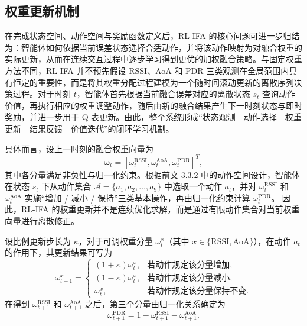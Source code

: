 \subsection{权重更新机制}
\label{subsec:3_3_4}

在完成状态空间、动作空间与奖励函数定义后，RL-IFA 的核心问题可进一步归结为：智能体如何依据当前误差状态选择合适动作，并将该动作映射为对融合权重的实际更新，从而在连续交互过程中逐步学习得到更优的加权融合策略。与固定权重方法不同，RL-IFA 并不预先假设 RSSI、AoA 和 PDR 三类观测在全局范围内具有恒定的重要性，而是将其权重分配过程建模为一个随时间滚动更新的离散序列决策过程。对于时刻 \(t\)，智能体首先根据当前融合误差对应的离散状态 \(s_t\) 查询动作价值，再执行相应的权重调整动作，随后由新的融合结果产生下一时刻状态与即时奖励，并进一步用于 Q 表更新。由此，整个系统形成“状态观测—动作选择—权重更新—结果反馈—价值迭代”的闭环学习机制。

具体而言，设上一时刻的融合权重向量为
\begin{equation}
\boldsymbol{\omega}_t
=
\left[
\omega_t^{\mathrm{RSSI}},
\omega_t^{\mathrm{AoA}},
\omega_t^{\mathrm{PDR}}
\right]^T,
\label{eq:3_19_rlifa_weight_vector}
\end{equation}
其中各分量满足非负性与归一化约束。根据前文 3.3.2 中的动作空间设计，智能体在状态 \(s_t\) 下从动作集合
\(\mathcal{A}=\{a_1,a_2,\ldots,a_9\}\)
中选取一个动作 \(a_t\)，并对
\(\omega_t^{\mathrm{RSSI}}\)
和
\(\omega_t^{\mathrm{AoA}}\)
实施“增加 / 减小 / 保持”三类基本操作，再由归一化约束计算
\(\omega_t^{\mathrm{PDR}}\)。
因此，RL-IFA 的权重更新并不是连续优化求解，而是通过有限动作集合对当前权重向量进行离散修正。

设比例更新步长为 \(\kappa\)，对于可调权重分量
\(\omega_t^{x}\)（其中 \(x\in\{\mathrm{RSSI},\mathrm{AoA}\}\)），在动作 \(a_t\) 的作用下，其更新结果可写为
\begin{equation}
\omega_{t+1}^{x}=
\begin{cases}
(1+\kappa)\omega_t^{x}, & \text{若动作规定该分量增加},\\[4pt]
(1-\kappa)\omega_t^{x}, & \text{若动作规定该分量减小},\\[4pt]
\omega_t^{x}, & \text{若动作规定该分量保持不变}.
\end{cases}
\label{eq:3_20_rlifa_weight_update}
\end{equation}
在得到
\(\omega_{t+1}^{\mathrm{RSSI}}\)
和
\(\omega_{t+1}^{\mathrm{AoA}}\)
之后，第三个分量由归一化关系确定为
\begin{equation}
\omega_{t+1}^{\mathrm{PDR}}
=
1-\omega_{t+1}^{\mathrm{RSSI}}-\omega_{t+1}^{\mathrm{AoA}}.
\label{eq:3_21_rlifa_weight_pdr}
\end{equation}


